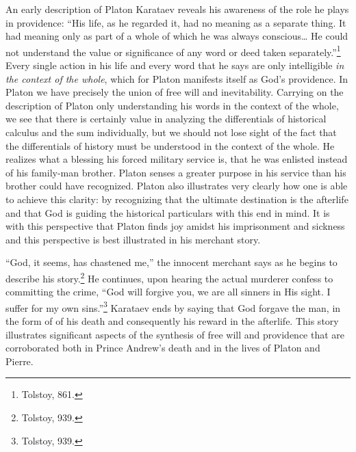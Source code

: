 \documentclass[12pt]{article}
\begin{document}
An early description of Platon Karataev reveals his awareness of the role he plays in providence: ``His life, as he regarded it, had no meaning as a separate thing. It had meaning only as part of a whole of which he was always conscious… He could not understand the value or significance of any word or deed taken separately.''\footnote{Tolstoy, 861.} Every single action in his life and every word that he says are only intelligible \emph{in the context of the whole}, which for Platon manifests itself as God’s providence. In Platon we have precisely the union of free will and inevitability. Carrying on the description of Platon only understanding his words in the context of the whole, we see that there is certainly value in analyzing the differentials of historical calculus and the sum individually, but we should not lose sight of the fact that the differentials of history must be understood in the context of the whole. He realizes what a blessing his forced military service is, that he was enlisted instead of his family-man brother.  Platon senses a greater purpose in his service than his brother could have recognized. Platon also illustrates very clearly how one is able to achieve this clarity: by recognizing that the ultimate destination is the afterlife and that God is guiding the historical particulars with this end in mind. It is with this perspective that Platon finds joy amidst his imprisonment and sickness and this perspective is best illustrated in his merchant story.

 ``God, it seems, has chastened me,'' the innocent merchant says as he begins to describe his story.\footnote{Tolstoy, 939.} He continues, upon hearing the actual murderer confess to committing the crime, ``God will forgive you, we are all sinners in His sight. I suffer for my own sins.''\footnote{Tolstoy, 939.} Karataev ends by saying that God forgave the man, in the form of of his death and consequently his reward in the afterlife. This story illustrates significant aspects of the synthesis of free will and providence that are corroborated both in Prince Andrew’s death and in the lives of Platon and Pierre.
 
\end{document}
